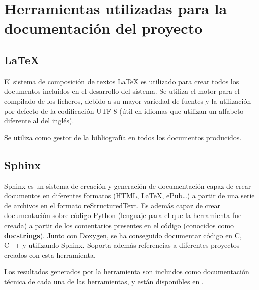 \section{Herramientas utilizadas para la documentación del proyecto}

\subsection{{\LaTeX}}

El sistema de composición de textos {\LaTeX} es utilizado para crear todos los documentos incluidos en el desarrollo del sistema. Se utiliza el motor {\XeLaTeX} para el compilado de los ficheros, debido a su mayor variedad de fuentes y la utilización por defecto de la codificación UTF-8 (útil en idiomas que utilizan un alfabeto diferente al del inglés). 

Se utiliza {\BibTeX} como gestor de la bibliografía en todos los documentos producidos.

\subsection{Sphinx}

Sphinx es un sistema de creación y generación de documentación capaz de crear documentos en diferentes formatos (HTML, \LaTeX, ePub\dots) a partir de una serie de archivos en el formato reStructuredText. Es además capaz de crear documentación sobre código Python (lenguaje para el que la herramienta fue creada) a partir de los comentarios presentes en el código (conocidos como \textbf{docstrings}). Junto con Doxygen, se ha conseguido documentar código en C, C++ y %
utilizando Sphinx. Soporta además referencias a diferentes proyectos creados con esta herramienta.

Los resultados generados por la herramienta son incluidos como documentación técnica de cada una de las herramientas, y están disponibles en \href{marcopolo.martinarroyo.net}.



